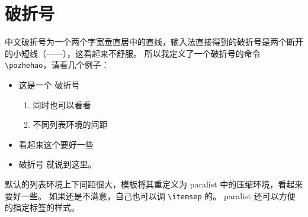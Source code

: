 \documentclass[../Main/thesis.tex]{subfiles}
\begin{document}
\section{破折号}
\label{sec:pozhehao}

中文破折号为一个两个字宽垂直居中的直线，输入法直接得到的破折号是两个断开的小短线（——），这看起来不舒服。
所以我定义了一个破折号的命令 \verb|\pozhehao|，请看几个例子：
\begin{itemize}
  \item 这是一个 \pozhehao 破折号
        \begin{enumerate}[(1)]
          \item 同时也可以看看
          \item 不同列表环境的间距
        \end{enumerate}
  \item 看起来这个要好一些
  \item 破折号 \pozhehao 就说到这里。
\end{itemize}

默认的列表环境上下间距很大，模板将其重定义为 \textsf{paralist} 中的压缩环境，看起来要好一些。
如果还是不满意，自己也可以调 \verb|\itemsep| 的。
\textsf{paralist} 还可以方便的指定标签的样式。
\end{document}
